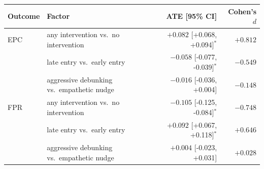 \begin{tabular}{llrr}
\toprule
Outcome & Factor & ATE [95\% CI] & Cohen's $d$ \\
\midrule
EPC & any intervention vs.\ no intervention & $+0.082$ [+0.068, +0.094]$^{*}$ & $+0.812$ \\
 & late entry vs.\ early entry & $-0.058$ [-0.077, -0.039]$^{*}$ & $-0.549$ \\
 & aggressive debunking vs.\ empathetic nudge & $-0.016$ [-0.036, +0.004] & $-0.148$ \\
\midrule
FPR & any intervention vs.\ no intervention & $-0.105$ [-0.125, -0.084]$^{*}$ & $-0.748$ \\
 & late entry vs.\ early entry & $+0.092$ [+0.067, +0.118]$^{*}$ & $+0.646$ \\
 & aggressive debunking vs.\ empathetic nudge & $+0.004$ [-0.023, +0.031] & $+0.028$ \\
\bottomrule
\end{tabular}
